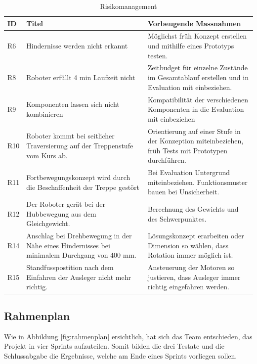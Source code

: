 \begin{center}
\begin{table}[H]
    \begin{tabularx}{\textwidth}{l|X|X}
        \textbf{ID} & \textbf{Titel} & \textbf{Vorbeugende Massnahmen} \\ \hline
        R6 & Hindernisse werden nicht erkannt & Möglichst früh Konzept erstellen und mithilfe eines Prototyps testen. \\
        R8 & Roboter erfüllt 4 min Laufzeit nicht & Zeitbudget für einzelne Zustände im Gesamtablauf erstellen und in Evaluation mit einbeziehen. \\ 
        R9 & Komponenten lassen sich nicht kombinieren & Kompatibilität der verschiedenen Komponenten in die Evaluation mit einbeziehen \\
        R10 & Roboter kommt bei seitlicher Traversierung auf der Treppenstufe vom Kurs ab.& Orientierung auf einer Stufe in der Konzeption miteinbeziehen, früh Tests mit Prototypen durchführen.\\
        R11 & Fortbewegungskonzept wird durch die Beschaffenheit der Treppe gestört & Bei Evaluation Untergrund miteinbeziehen. Funktionsmuster bauen bei Unsicherheit. \\
        R12 & Der Roboter gerät bei der Hubbewegung aus dem Gleichgewicht. & Berechnung des Gewichts und des Schwerpunktes.\\
        R14 & Anschlag bei Drehbewegung in der Nähe eines Hindernisses bei minimalem Durchgang von 400 mm. & Lösungskonzept erarbeiten oder Dimension so wählen, dass Rotation immer möglich ist. \\
        R15 & Standfusspostition nach dem Einfahren der Ausleger nicht mehr richtig. & Ansteuerung der Motoren so justieren, dass Ausleger immer richtig eingefahren werden. \\
    \end{tabularx}
    \caption{Risikomanagement}
    \label{tab:risikomanagement}
\end{table}
\end{center}
  
\subsection{Rahmenplan}
Wie in Abbildung \ref{fig:rahmenplan} ersichtlich, hat sich das Team entschieden, das Projekt in vier Sprints aufzuteilen. Somit bilden die drei Testate und die Schlussabgabe die Ergebnisse, welche am Ende eines Sprints vorliegen sollen.

